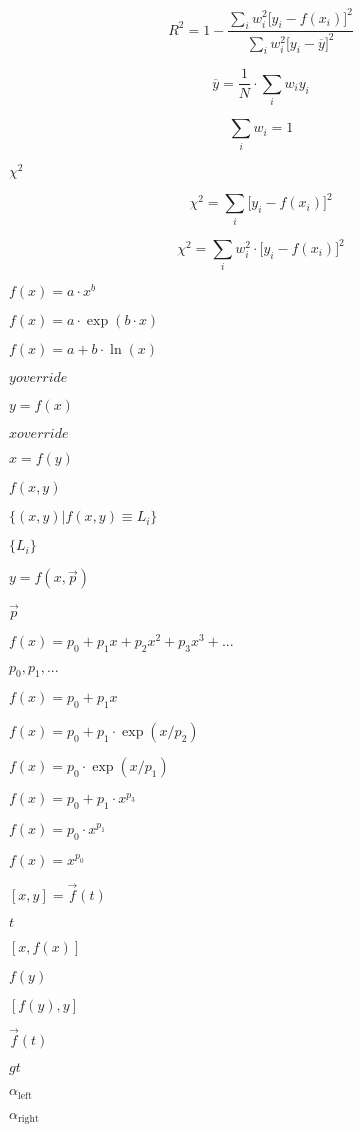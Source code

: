 \documentclass{article}
\begin{document}
\[ R^2=1-\frac{\sum_iw_i^2\bigl[y_i-f(x_i)\bigr]^2}{\sum_iw_i^2\bigl[y_i-\overline{y}\bigr]^2} \]
\pagebreak

\[ \overline{y}=\frac{1}{N}\cdot\sum_iw_iy_i \]
\pagebreak

\[ \sum_iw_i=1 \]
\pagebreak

$ \chi^2 $
\pagebreak

\[ \chi^2=\sum_i\bigl[y_i-f(x_i)\bigr]^2 \]
\pagebreak

\[ \chi^2=\sum_iw_i^2\cdot\bigl[y_i-f(x_i)\bigr]^2 \]
\pagebreak

$ f(x)=a\cdot x^b $
\pagebreak

$ f(x)=a\cdot \exp(b\cdot x) $
\pagebreak

$ f(x)=a+b\cdot \ln(x) $
\pagebreak

$ yoverride $
\pagebreak

$ y=f(x) $
\pagebreak

$ xoverride $
\pagebreak

$ x=f(y) $
\pagebreak

$ f(x,y) $
\pagebreak

$ \{(x,y)|f(x,y)\equiv L_i\} $
\pagebreak

$ \{L_i\} $
\pagebreak

$ y=f(x, \vec{p}) $
\pagebreak

$ \vec{p} $
\pagebreak

$ f(x)=p_0+p_1x+p_2x^2+p_3x^3+... $
\pagebreak

$ p_0, p_1, ... $
\pagebreak

$ f(x)=p_0+p_1x $
\pagebreak

$ f(x)=p_0+p_1\cdot\exp(x/p_2) $
\pagebreak

$ f(x)=p_0\cdot\exp(x/p_1) $
\pagebreak

$ f(x)=p_0+p_1\cdot x^{p_3} $
\pagebreak

$ f(x)=p_0\cdot x^{p_1} $
\pagebreak

$ f(x)= x^{p_0} $
\pagebreak

$ [x,y]=\vec{f}(t) $
\pagebreak

$ t $
\pagebreak

$ [x, f(x)] $
\pagebreak

$ f(y) $
\pagebreak

$ [f(y), y] $
\pagebreak

$ \vec{f}(t) $
\pagebreak

$ gt $
\pagebreak

$ \alpha_{\mbox{left}} $
\pagebreak

$ \alpha_{\mbox{right}} $
\pagebreak
\end{document}
